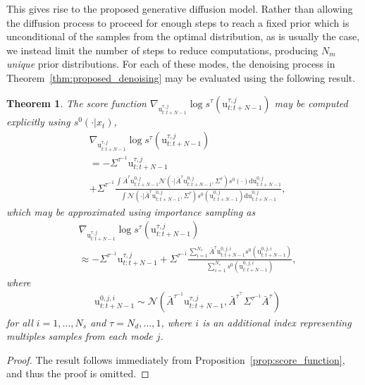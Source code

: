 \documentclass[letterpaper, 10 pt, conference]{IEEEconf}
\newtheorem{theorem}{Theorem}
\begin{document}
This gives rise to the proposed generative diffusion model.
Rather than allowing the diffusion process to proceed for enough steps to reach a fixed prior which is unconditional of the samples from the optimal distribution, as is usually the case, we instead limit the number of steps to reduce computations, producing $N_m$ \emph{unique} prior distributions.
For each of these modes, the denoising process in Theorem~\ref{thm:proposed_denoising} may be evaluated using the following result.
\begin{theorem} \label{thm:score_function}
    The score function $\nabla_{\mathrm{u}_{t:t+N-1}^{\tau, j}} \log{s^{\tau}(\mathrm{u}_{t:t+N-1}^{\tau, j})}$ may be computed explicitly using $s^{0}(\cdot | x_{t})$,
    \begin{align} \label{eq:score_function_control}
        &\nabla_{\mathrm{u}_{t:t+N-1}^{\tau, j}} \log{s^{\tau}(\mathrm{u}_{t:t+N-1}^{\tau, j})} \\
        & = - \Sigma^{\tau^{-1}} \mathrm{u}_{t:t+N-1}^{\tau, j} \nonumber\\
        &+ \Sigma^{\tau^{-1}} \frac{\int \bar{A}^{\tau} \mathrm{u}_{t:t+N-1}^{0, j} \mathcal{N}(\cdot | \bar{A}^{\tau} \mathrm{u}_{t:t+N-1}^{0, j}, \Sigma^{\tau}) s^{0}(\cdot) \mathrm{d}\mathrm{u}_{t:t+N-1}^{0, j}} {\int \mathcal{N}(\cdot | \bar{A}^{\tau} \mathrm{u}_{t:t+N-1}^{0, j}, \Sigma^{\tau}) s^{0}(\mathrm{u}_{t:t+N-1}^{0, j}) \mathrm{d}\mathrm{u}_{t:t+N-1}^{0, j}}, \nonumber
    \end{align}
    which may be approximated using importance sampling as
    \begin{align}\label{eq:is_score_function_control}
        &\nabla_{\mathrm{u}_{t:t+N-1}^{\tau, j}} \log{s^{\tau}(\mathrm{u}_{t:t+N-1}^{\tau, j})} \\
        &\approx - \Sigma^{\tau^{-1}} \mathrm{u}_{t:t+N-1}^{\tau, j} + \Sigma^{\tau^{-1}} \frac{\sum_{i=1}^{N_s} \bar{A}^{\tau} \mathrm{u}_{t:t+N-1}^{0, j, i} s^{0}(\mathrm{u}_{t:t+N-1}^{0, j, i})} {\sum_{i=1}^{N_s} s^{0}(\mathrm{u}_{t:t+N-1}^{0, j, i})}, \nonumber
    \end{align}
    where 
    \begin{align} \label{eq:importance_sampling}
        &\mathrm{u}_{t:t+N-1}^{0, j, i} \sim \mathcal{N}(\bar{A}^{\tau^{-1}} \mathrm{u}_{t:t+N-1}^{\tau, j}, \bar{A}^{\tau^\top} \Sigma^{\tau^{-1}} \bar{A}^{\tau})
    \end{align}
    for all $i = 1, \dots, N_s$ and $\tau = N_d, \dots, 1$, where $i$ is an additional index representing multiples samples from each mode $j$.
\end{theorem}
\begin{proof}
    The result follows immediately from Proposition~\ref{prop:score_function}, and thus the proof is omitted.
\end{proof}
\end{document}
